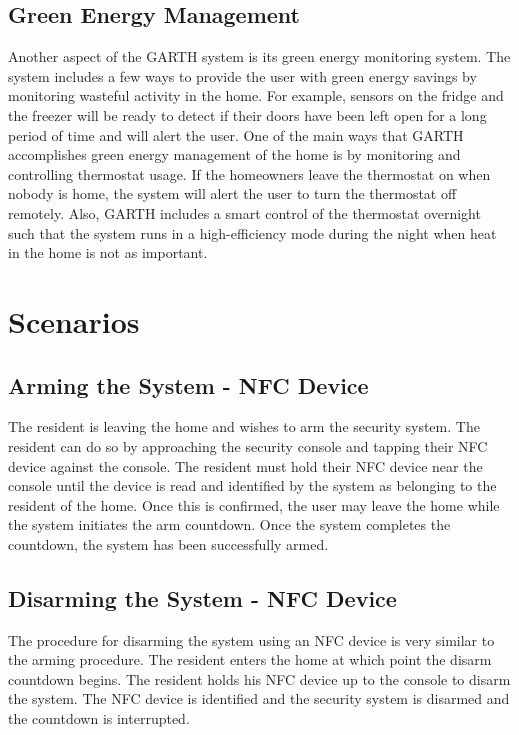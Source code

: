 \documentclass{report}
\begin{document}
\subsection{Green Energy Management}

Another aspect of the GARTH system is its green energy monitoring system. The
system includes a few ways to provide the user with green energy savings by
monitoring wasteful activity in the home. For example, sensors on the fridge and 
the freezer will be ready to detect if their doors have been left open for a long period
of time and will alert the user. One of the main ways that GARTH accomplishes
green energy management of the home is by monitoring and controlling thermostat 
usage. If the homeowners leave the thermostat on when nobody is home, the
system will alert the user to turn the thermostat off remotely. Also, GARTH includes
a smart control of the thermostat overnight such that the system runs in a high-efficiency
mode during the night when heat in the home is not as important.

\section{Scenarios}

\subsection*{Arming the System - NFC Device}

The resident is leaving the home and wishes to arm the security system. The
resident can do so by approaching the security console and tapping their NFC
device against the console. The resident must hold their NFC
device near the console until the device is read and identified by the system
as belonging to the resident of the home. Once this is confirmed, the user may
leave the home while the system initiates the arm countdown. Once the system
completes the countdown, the system has been successfully armed.

\subsection*{Disarming the System - NFC Device}

The procedure for disarming the system using an NFC device is very similar to
the arming procedure. The resident enters the home at which point the disarm
countdown begins. The resident holds his NFC device up to the console to disarm
the system. The NFC device is identified and the security system is disarmed
and the countdown is interrupted.
\end{document}

